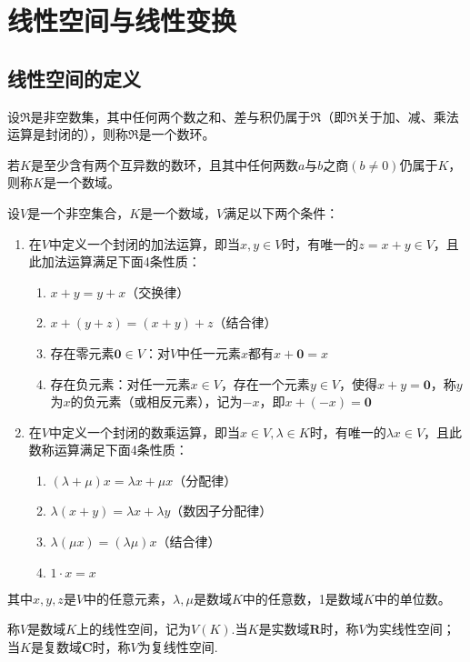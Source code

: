 \section{线性空间与线性变换}

\subsection{线性空间的定义}
    \begin{definition}[数环]
        设$\mathfrak{R}$是非空数集，其中任何两个数之和、差与积仍属于$\mathfrak{R}$（即$\mathfrak{R}$关于加、减、乘法运算是封闭的），则称$\mathfrak{R}$是一个{\heiti 数环}。
    \end{definition}

    \begin{definition}[数域]
        若$K$是至少含有两个互异数的数环，且其中任何两数$a$与$b$之商$(b\neq 0)$仍属于$K$，则称$K$是一个{\heiti 数域}。
    \end{definition}

    \begin{definition}[线性空间]
        设$V$是一个非空集合，$K$是一个数域，$V$满足以下两个条件：
        \begin{enumerate}[(1)]
            \item 在$V$中定义一个封闭的加法运算，即当$x,y\in V$时，有唯一的$z=x+y\in V$，且此加法运算满足下面4条性质：
            \begin{enumerate}[1)]
                \item $x+y=y+x$（交换律）
                \item $x+(y+z)=(x+y)+z$（结合律）
                \item 存在{\heiti 零元素$\boldsymbol{0}\in V$}：对$V$中任一元素$x$都有$x+\boldsymbol{0}=x$
                \item 存在{\heiti 负元素}：对任一元素$x\in V$，存在一个元素$y\in V$，使得$x+y=\boldsymbol{0}$，称$y$为$x$的负元素（或相反元素），记为$-x$，即$x+(-x)=\boldsymbol{0}$
            \end{enumerate}
            \item 在$V$中定义一个封闭的数乘运算，即当$x\in V,\lambda\in K$时，有唯一的$\lambda x\in V$，且此数称运算满足下面4条性质：
            \begin{enumerate}[1)]
                \item $(\lambda+\mu)x=\lambda x+\mu x$（分配律）
                \item $\lambda(x+y)=\lambda x+\lambda y$（数因子分配律）
                \item $\lambda(\mu x)=(\lambda \mu )x$（结合律）
                \item $1\cdot x=x$
            \end{enumerate}
        \end{enumerate}
        其中$x,y,z$是$V$中的任意元素，$\lambda,\mu$是数域$K$中的任意数，1是数域$K$中的单位数。

        称$V$是数域$K$上的{\heiti 线性空间}，记为$V(K)$.当$K$是实数域$\mathbf{R}$时，称$V$为{\heiti 实线性空间}；
        当$K$是复数域$\mathbf{C}$时，称$V$为{\heiti 复线性空间}.
    \end{definition}

